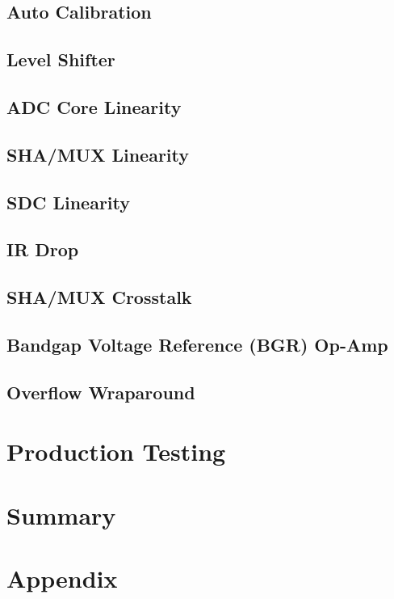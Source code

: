 \documentclass[10pt]{article}
\begin{document}
\subsection{Auto Calibration}

\subsection{Level Shifter}

\clearpage
\newpage
\subsection{ADC Core Linearity }

\clearpage
\newpage
\subsection{SHA/MUX Linearity  }

\clearpage
\newpage
\subsection{SDC Linearity }

\clearpage
\newpage
\subsection{IR Drop }

\subsection{SHA/MUX Crosstalk }

\subsection{Bandgap Voltage Reference (BGR) Op-Amp }

\subsection{Overflow Wraparound }

\clearpage
\newpage
\section{Production Testing }


\section{Summary}  
%	

\newpage



\newpage
\section*{Appendix}

\end{document}
